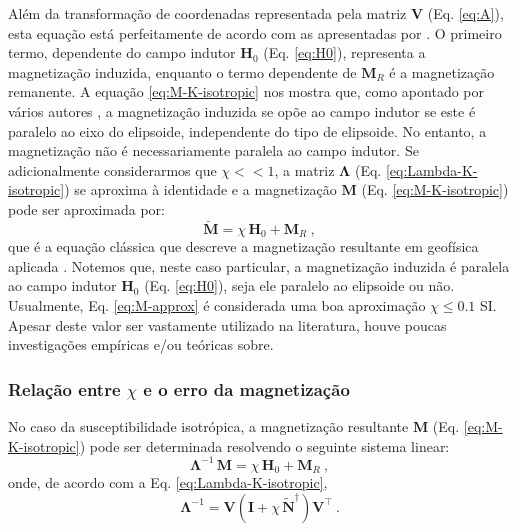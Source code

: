 Além da transformação de coordenadas representada pela matriz $\mathbf{V}$ (Eq. \ref{eq:A}),
esta equação está perfeitamente de acordo com as apresentadas por \citet[Eqs. ~13--15]{guo2001}.
O primeiro termo, dependente do campo indutor $\mathbf{H}_{0}$
(Eq. \ref{eq:H0}), 
representa a magnetização induzida, enquanto o termo dependente de
$\mathbf{M}_{R}$ é a magnetização remanente.
A equação \ref{eq:M-K-isotropic} nos mostra que, como apontado por vários autores
\citep[e.g.,][]{maxwell1873, dubois1896, stoner1945, clark1986, sttraton2007},
a magnetização induzida se opõe ao campo indutor 
se este é paralelo ao eixo do elipsoide, 
independente do tipo de elipsoide. No entanto, a
magnetização não é necessariamente paralela ao campo indutor.
Se adicionalmente considerarmos que $\chi << 1$, a matriz
$\mathbf{\Lambda}$ (Eq. \ref{eq:Lambda-K-isotropic})
se aproxima à identidade e a magnetização
$\mathbf{M}$ (Eq. \ref{eq:M-K-isotropic})
pode ser aproximada por:
\begin{equation}
\breve{\mathbf{M}} = \chi \, \mathbf{H}_{0} +
\mathbf{M}_{R} \: ,
\label{eq:M-approx}
\end{equation}
que é a equação clássica que descreve a magnetização resultante em geofísica aplicada \citep[p. ~89]{blakely1996}.
Notemos que, neste caso particular, a magnetização induzida
é paralela ao campo indutor $\mathbf{H}_{0}$ (Eq. \ref{eq:H0}),
seja ele paralelo ao elipsoide ou não.
Usualmente, Eq. \ref{eq:M-approx}
é considerada uma boa aproximação $\chi \leq 0.1$ SI.
Apesar deste valor ser vastamente utilizado na literatura,
houve poucas investigações empíricas e/ou teóricas sobre.

\subsubsection{Relação entre $\chi$ e o erro da magnetização}

No caso da susceptibilidade isotrópica, a magnetização resultante
$\mathbf{M}$ (Eq. \ref{eq:M-K-isotropic}) pode ser determinada resolvendo o seguinte sistema linear:
\begin{equation}
\mathbf{\Lambda}^{-1} \, \mathbf{M} = \chi \, \mathbf{H}_{0} +
\mathbf{M}_{R} \: ,
\label{eq:M-K-isotropic-inverse-Lambda}
\end{equation}
onde, de acordo com a Eq. \ref{eq:Lambda-K-isotropic},
\begin{equation}
\mathbf{\Lambda}^{-1} = \mathbf{V}
\left( \mathbf{I} + \chi \, \tilde{\mathbf{N}}^{\dagger} \right)
\mathbf{V}^{\top} \: .
\label{eq:inverse-Lambda}
\end{equation}


